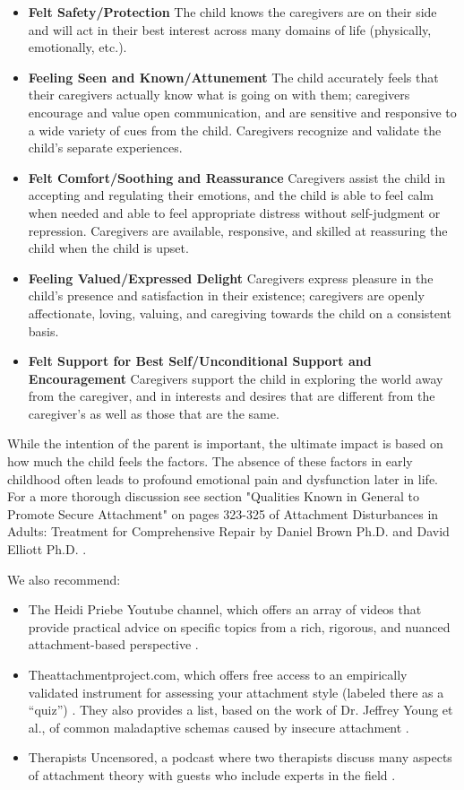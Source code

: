 \documentclass[12pt,letterpaper]{article}
\begin{document}
\begin{itemize}
    \item \textbf{Felt Safety/Protection} The child knows the caregivers are on their side and will act in their best interest across many domains of life (physically, emotionally, etc.).
    \item \textbf{Feeling Seen and Known/Attunement} The child accurately feels that their caregivers actually know what is going on with them; caregivers encourage and value open communication, and are sensitive and responsive to a wide variety of cues from the child. Caregivers recognize and validate the child's separate experiences.
    \item \textbf{Felt Comfort/Soothing and Reassurance} Caregivers assist the child in accepting and regulating their emotions, and the child is able to feel calm when needed and able to feel appropriate distress without self-judgment or repression. Caregivers are available, responsive, and skilled at reassuring the child when the child is upset.
    \item \textbf{Feeling Valued/Expressed Delight} Caregivers express pleasure in the child's presence and satisfaction in their existence; caregivers are openly affectionate, loving, valuing, and caregiving towards the child on a consistent basis.
    \item \textbf{Felt Support for Best Self/Unconditional Support and Encouragement} Caregivers support the child in exploring the world away from the caregiver, and in interests and desires that are different from the caregiver's as well as those that are the same.
\end{itemize}

While the intention of the parent is important, the ultimate impact is based on how much the child feels the factors. The absence of these factors in early childhood often leads to profound emotional pain and dysfunction later in life. For a more thorough discussion see section "Qualities Known in General to Promote Secure Attachment" on pages 323-325 of Attachment Disturbances in Adults: Treatment for Comprehensive Repair by Daniel Brown Ph.D. and David Elliott Ph.D. \cite{brownAttachmentDisturbances}.  

We also recommend:
\begin{itemize}
    \item The Heidi Priebe Youtube channel, which offers an array of videos that provide practical advice on specific topics from a rich, rigorous, and nuanced attachment-based perspective \cite{priebeYoutube}.
    \item Theattachmentproject.com, which offers free access to an empirically validated instrument for assessing your attachment style (labeled there as a “quiz”) \cite{attachmentProject}. They also provides a list, based on the work of Dr. Jeffrey Young et al., of common maladaptive schemas caused by insecure attachment \cite{earlyMalSchemas}.
    \item Therapists Uncensored, a podcast where two therapists discuss many aspects of attachment theory with guests who include experts in the field \cite{therapistsUncensored}.
\end{itemize}
\end{document}
